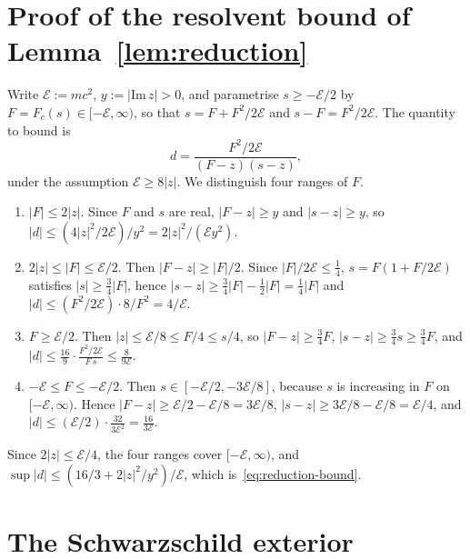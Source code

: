 \documentclass[%
 aip,
 jmp,
 amsmath,amssymb,
 reprint, onecolumn
]{revtex4-1}
\theoremstyle{definition}
\theoremstyle{remark}
\begin{document}
\appendix
\section{Proof of the resolvent bound of Lemma~\ref{lem:reduction}}
\label{app:reduction}

Write $\mathcal{E}:=mc^2$, $y:=|\mathrm{Im}\,z|>0$, and parametrise $s\geq-\mathcal{E}/2$ by
$F=F_c(s)\in[-\mathcal{E},\infty)$, so that $s=F+F^2/2\mathcal{E}$ and $s-F=F^2/2\mathcal{E}$. The
quantity to bound is
\[
d=\frac{F^2/2\mathcal{E}}{(F-z)(s-z)},
\]
under the assumption $\mathcal{E}\geq8|z|$. We distinguish four ranges of $F$.
\begin{enumerate}[label=(\roman*)]
\item $|F|\leq2|z|$. Since $F$ and $s$ are real, $|F-z|\geq y$ and
$|s-z|\geq y$, so $|d|\leq(4|z|^2/2\mathcal{E})/y^2=2|z|^2/(\mathcal{E}y^2)$.
\item $2|z|\leq|F|\leq \mathcal{E}/2$. Then $|F-z|\geq|F|/2$. Since
$|F|/2\mathcal{E}\leq\frac14$, $s=F(1+F/2\mathcal{E})$ satisfies $|s|\geq\frac34|F|$, hence
$|s-z|\geq\frac34|F|-\frac12|F|=\frac14|F|$ and $|d|\leq(F^2/2\mathcal{E})\cdot
8/F^2=4/\mathcal{E}$.
\item $F\geq \mathcal{E}/2$. Then $|z|\leq \mathcal{E}/8\leq F/4\leq s/4$, so $|F-z|\geq
\frac34F$, $|s-z|\geq\frac34s\geq\frac34F$, and $|d|\leq\frac{16}{9}
\cdot\frac{F^2/2\mathcal{E}}{F\,s}\leq\frac{8}{9\mathcal{E}}$.
\item $-\mathcal{E}\leq F\leq-\mathcal{E}/2$. Then $s\in[-\mathcal{E}/2,-3\mathcal{E}/8]$, because $s$ is
increasing in $F$ on $[-\mathcal{E},\infty)$. Hence $|F-z|\geq \mathcal{E}/2-\mathcal{E}/8=3\mathcal{E}/8$,
$|s-z|\geq3\mathcal{E}/8-\mathcal{E}/8=\mathcal{E}/4$, and $|d|\leq(\mathcal{E}/2)\cdot\frac{32}{3\mathcal{E}^2}=
\frac{16}{3\mathcal{E}}$.
\end{enumerate}
Since $2|z|\leq \mathcal{E}/4$, the four ranges cover $[-\mathcal{E},\infty)$, and
$\sup|d|\leq(16/3+2|z|^2/y^2)/\mathcal{E}$, which is~\eqref{eq:reduction-bound}.

\section{The Schwarzschild exterior}\label{app:schw}
\end{document}
